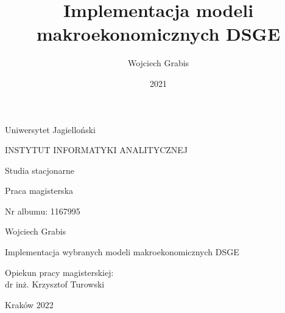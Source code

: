 \documentclass[twoside,a4paper,12pt]{report} %
\title{Implementacja modeli makroekonomicznych DSGE}
\author{Wojciech Grabis}
\date{2021}
\begin{document}
\titleformat{\chapter}[display] {\normalfont\Huge\bfseries}{\chaptertitlename\ \thechapter}{0pt}{\Huge}
\titlespacing{\chapter}{1cm}{2cm}{1cm}

\thispagestyle{empty}
\begin{center}{\sc \large
Uniwersytet Jagielloński\par\vspace{0.2cm}\par}
{\LARGE
INSTYTUT INFORMATYKI ANALITYCZNEJ}\par\vspace{0.2cm}\par
{\large
Studia stacjonarne}\par\vspace{1cm}\par
{\Large
Praca magisterska}%
\end{center}
\vspace{1.5cm}
\begin{flushleft}
{\large
Nr albumu: 1167995}%
\end{flushleft}
\vspace{1.5cm}
\begin{center}
{\LARGE
Wojciech Grabis
}\par\vspace{0.9cm}\par
{\huge
Implementacja wybranych modeli makroekonomicznych DSGE
}
\end{center}
\vspace{4cm}
\begin{flushright}

Opiekun pracy magisterskiej:\\
dr inż. Krzysztof Turowski%
\end{flushright}
\vfill
\begin{center}
Kraków 2022%
\end{center}

\leavevmode\thispagestyle{empty}\newpage

\makeatletter
\makeatother
\tableofcontents
\end{document}
